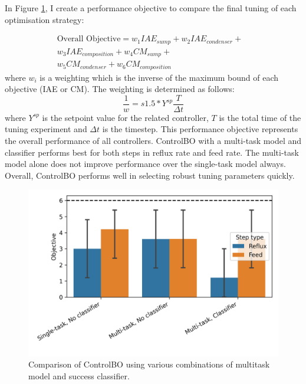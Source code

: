 In Figure \ref{fig:comparison_controlbo}, I create a performance objective to compare the final tuning of each optimisation strategy: 

\begin{equation}
\begin{split}
    \text{Overall Objective}= w_1 IAE_{sump} + w_2 IAE_{condenser} +  & \\ w_3 IAE_{composition} +  w_4 CM_{sump} + & \\  w_5 CM_{condenser} + w_6 CM_{composition}
\end{split}
\end{equation}
where $w_i$ is a weighting which is the inverse of the maximum bound of each objective (IAE or CM). The weighting is determined as follows:
\begin{equation}
    \frac{1}{w} = s1.5 * Y^{sp} \frac{T}{\Delta t}
\end{equation}
where $Y^{sp}$ is the setpoint value for the related controller, $T$ is the total time of the tuning experiment and $\Delta t$ is the timestep. This performance objective represents the overall performance of all controllers. ControlBO with a multi-task model and classifier performs best for both steps in reflux rate and feed rate. The multi-task model alone does not improve performance over the single-task model always. Overall, ControlBO performs well in selecting robust tuning parameters quickly.


\begin{figure}
    \centering
    \includegraphics[width=\textwidth]{gfx/Chapter06/comparison.png}
    \caption{Comparison of ControlBO using various combinations of multitask model and success classifier.}
    \label{fig:comparison_controlbo}
\end{figure}

